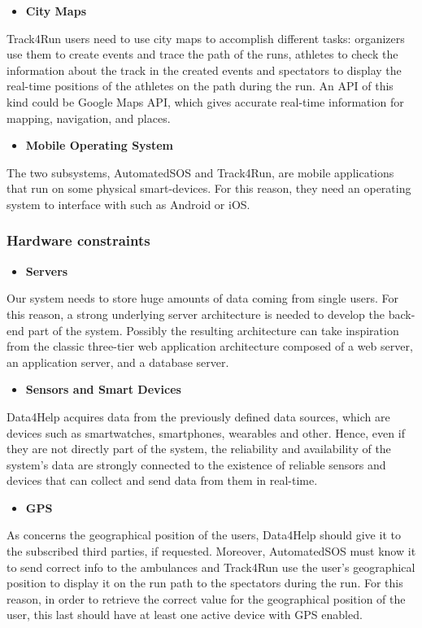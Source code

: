 \begin{itemize}
    \item \textbf{City Maps}
\end{itemize}

Track4Run users need to use city maps to accomplish different tasks: organizers use them to create events and trace the path of the runs, athletes to check the information about the track in the created events and spectators to display the real-time positions of the athletes on the path during the run. An API of this kind could be Google Maps API, which gives accurate real-time information for mapping, navigation, and places.

\begin{itemize}
    \item \textbf{Mobile Operating System}
\end{itemize}

The two subsystems, AutomatedSOS and Track4Run, are mobile applications that run on some physical smart-devices. For this reason, they need an operating system to interface with such as Android or iOS.
\subsubsection{Hardware constraints}

\begin{itemize}
    \item \textbf{Servers}
\end{itemize}
Our system needs to store huge amounts of data coming from single users. For this reason, a strong underlying server architecture is needed to develop the back-end part of the system. Possibly the resulting architecture can take inspiration from the classic three-tier web application architecture composed of a web server, an application server, and a database server.

\begin{itemize}
    \item \textbf{Sensors and Smart Devices}
\end{itemize}
Data4Help acquires data from the previously defined data sources, which are devices such as smartwatches, smartphones, wearables and other. Hence, even if they are not directly part of the system, the reliability and availability of the system's data are strongly connected to the existence of reliable sensors and devices that can collect and send data from them in real-time.

\begin{itemize}
    \item \textbf{GPS}
\end{itemize}
As concerns the geographical position of the users, Data4Help should give it to the subscribed third parties, if requested. Moreover, AutomatedSOS must know it to send correct info to the ambulances and Track4Run use the user's geographical position to display it on the run path to the spectators during the run. For this reason, in order to retrieve the correct value for the geographical position of the user, this last should have at least one active device with GPS enabled.

